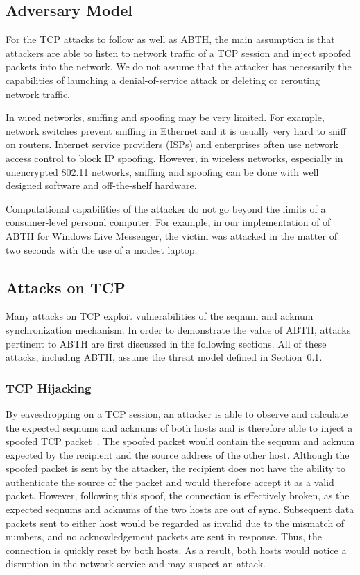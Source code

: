 \documentclass{sig-alternate}
\begin{document}
\subsection{Adversary Model}
\label{sec:adversarymodel}

For the TCP attacks to follow as well as ABTH, the main assumption is that attackers are able to listen to network traffic of a TCP session and inject spoofed packets into the network.
We do not assume that the attacker has necessarily the capabilities of launching a denial-of-service attack or deleting or rerouting network traffic.

In wired networks, sniffing and spoofing may be very limited.
For example, network switches prevent sniffing in Ethernet and it is usually very hard to sniff on routers.
Internet service providers (ISPs) and enterprises often use network access control to block IP spoofing.
However, in wireless networks, especially in unencrypted 802.11 networks, sniffing and spoofing can be done with well designed software and off-the-shelf hardware.

Computational capabilities of the attacker do not go beyond the limits of a consumer-level personal computer.
For example, in our implementation of of ABTH for Windows Live Messenger, the victim was attacked in the matter of two seconds with the use of a modest laptop.

\subsection{Attacks on TCP}

Many attacks on TCP exploit vulnerabilities of the seqnum and acknum synchronization mechanism.
In order to demonstrate the value of ABTH, attacks pertinent to ABTH are first discussed in the following sections.
All of these attacks, including ABTH, assume the threat model defined in Section~\ref{sec:adversarymodel}.

\subsubsection{TCP Hijacking}

By eavesdropping on a TCP session, an attacker is able to observe and calculate the expected seqnums and acknums of both hosts and is therefore able to inject a spoofed TCP packet~\cite{harris:tcpattacks}.
The spoofed packet would contain the seqnum and acknum expected by the recipient and the source address of the other host.
Although the spoofed packet is sent by the attacker, the recipient does not have the ability to authenticate the source of the packet and would therefore accept it as a valid packet.
However, following this spoof, the connection is effectively broken, as the expected seqnums and acknums of the two hosts are out of sync.
Subsequent data packets sent to either host would be regarded as invalid due to the mismatch of numbers, and no acknowledgement packets are sent in response.
Thus, the connection is quickly reset by both hosts.
As a result, both hosts would notice a disruption in the network service and may suspect an attack.
\end{document}
